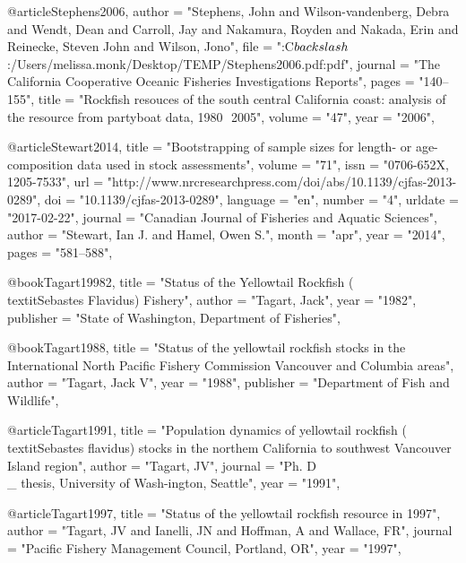 {@article{Stephens2006,
    author = "{Stephens, John and Wilson-vandenberg, Debra and Wendt, Dean and Carroll, Jay and Nakamura, Royden and Nakada, Erin and Reinecke, Steven John and Wilson, Jono}",
    file = "{:C$\\backslash$:/Users/melissa.monk/Desktop/TEMP/Stephens2006.pdf:pdf}",
    journal = "{The California Cooperative Oceanic Fisheries Investigations Reports}",
    pages = "{140--155}",
    title = "{{Rockfish resouces of the south central California coast: analysis of the resource from partyboat data, 1980  2005}}",
    volume = "{47}",
    year = "{2006}",
}

@article{Stewart2014,
    title = "{Bootstrapping of sample sizes for length- or age-composition data used in stock assessments}",
    volume = "{71}",
    issn = "{0706-652X, 1205-7533}",
    url = "{http://www.nrcresearchpress.com/doi/abs/10.1139/cjfas-2013-0289}",
    doi = "{10.1139/cjfas-2013-0289}",
    language = "{en}",
    number = "{4}",
    urldate = "{2017-02-22}",
    journal = "{Canadian Journal of Fisheries and Aquatic Sciences}",
    author = "{Stewart, Ian J. and Hamel, Owen S.}",
    month = "apr",
    year = "{2014}",
    pages = "{581--588}",
}

@book{Tagart19982,
    title = "{Status of the Yellowtail Rockfish (\\textit{{Sebastes} Flavidus}) Fishery}",
    author = "{Tagart, Jack}",
    year = "{1982}",
    publisher = "{State of Washington, Department of Fisheries}",
}

@book{Tagart1988,
    title = "{Status of the yellowtail rockfish stocks in the International North Pacific Fishery Commission Vancouver and Columbia areas}",
    author = "{Tagart, Jack V}",
    year = "{1988}",
    publisher = "{Department of Fish and Wildlife}",
}

@article{Tagart1991,
    title = "{Population dynamics of yellowtail rockfish (\\textit{{Sebastes} flavidus}) stocks in the northem California to southwest Vancouver Island region}",
    author = "{Tagart, JV}",
    journal = "{Ph. D\\_ thesis, University of Wash-ington, Seattle}",
    year = "{1991}",
}

@article{Tagart1997,
    title = "{Status of the yellowtail rockfish resource in 1997}",
    author = "{Tagart, JV and Ianelli, JN and Hoffman, A and Wallace, FR}",
    journal = "{Pacific Fishery Management Council, Portland, OR}",
    year = "{1997}",
}

}
